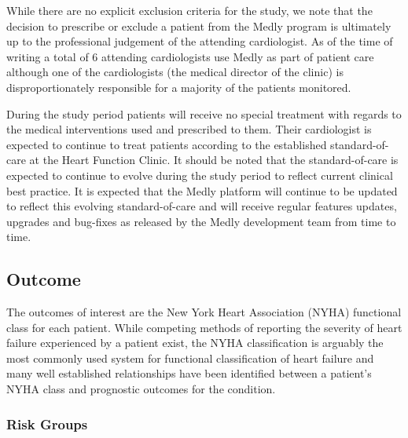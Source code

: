 \documentclass[]{article}
\begin{document}
While there are no explicit exclusion criteria for the study, we note that the decision to prescribe or exclude a patient from the Medly program is ultimately up to the professional judgement of the attending cardiologist. As of the time of writing a total of 6 attending cardiologists use Medly as part of patient care although one of the cardiologists (the medical director of the clinic) is disproportionately responsible for a majority of the patients monitored.

During the study period patients will receive no special treatment with regards to the medical interventions used and prescribed to them. Their cardiologist is expected to continue to treat patients according to the established standard-of-care at the Heart Function Clinic. It should be noted that the standard-of-care is expected to continue to evolve during the study period to reflect current clinical best practice. It is expected that the Medly platform will continue to be updated to reflect this evolving standard-of-care and will receive regular features updates, upgrades and bug-fixes as released by the Medly development team from time to time.



\subsection{Outcome} %

The outcomes of interest are the New York Heart Association (NYHA) functional class for each patient. While competing methods of reporting the severity of heart failure experienced by a patient exist, the NYHA classification is arguably the most commonly used system for functional classification of heart failure and many well established relationships have been identified between a patient's NYHA class and prognostic outcomes for the condition. 

\subsubsection{Risk Groups} %
\end{document}
